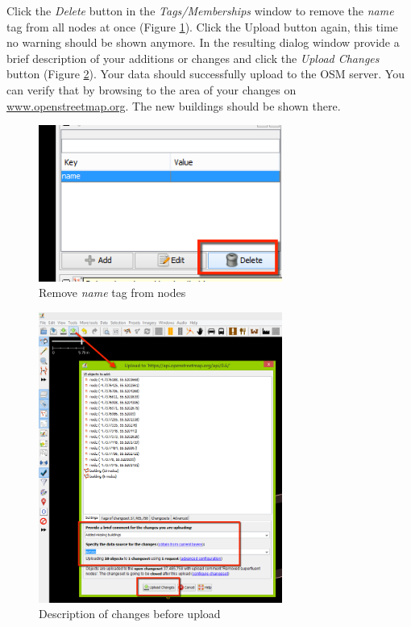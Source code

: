 \documentclass[a4paper,12pt,titlepage]{article}
\begin{document}
Click the \textit{Delete} button in the \textit{Tags/Memberships} window to remove the \textit{name} tag from all nodes at once (Figure \ref{fig:remove_tag}). Click the Upload button again, this time no warning should be shown anymore. In the resulting dialog window provide a brief description of your additions or changes and click the \textit{Upload Changes} button (Figure \ref{fig:upload_attempt_2}). Your data should successfully upload to the OSM server. You can verify that by browsing to the area of your changes on \url{www.openstreetmap.org}. The new buildings should be shown there.

\begin{figure}[H]
	\centering
	\includegraphics[width=8cm]{Images/remove_tag.png}
	\caption{Remove \textit{name} tag from nodes}\label{fig:remove_tag}
\end{figure}

\begin{figure}[H]
	\centering
	\includegraphics[width=8cm]{Images/upload_attempt_2.png}
	\caption{Description of changes before upload}\label{fig:upload_attempt_2}
\end{figure}
\end{document}
